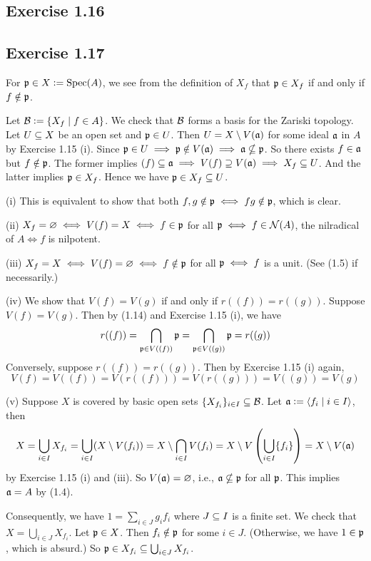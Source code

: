 \documentclass[../A&M.tex]{subfiles}
\begin{document}
\subsection*{Exercise 1.16}

\subsection*{Exercise 1.17}

For $\mathfrak{p}\in X:=\operatorname{Spec}(A)$, we see from the definition of $X_f$ that $\mathfrak{p}\in X_f$ if and only if $f\notin\mathfrak{p}$.

Let $\mathcal{B}:=\{ X_f \mid f\in A\}$. We check that $\mathcal{B}$ forms a basis for the Zariski topology. Let $U\subseteq X$ be an open set and $\mathfrak{p}\in U$. Then $U=X \setminus V(\mathfrak{a})$ for some ideal $\mathfrak{a}$ in $A$ by Exercise 1.15 (i). Since $\mathfrak{p}\in U \implies \mathfrak{p}\notin V(\mathfrak{a}) \implies \mathfrak{a}\nsubseteq\mathfrak{p}$. So there exists $f\in\mathfrak{a}$ but $f\notin\mathfrak{p}$. The former implies $(f)\subseteq\mathfrak{a} \implies V(f)\supseteq V(\mathfrak{a}) \implies X_f \subseteq U$. And the latter implies $\mathfrak{p}\in X_f$. Hence we have $\mathfrak{p} \in X_f \subseteq U$.

(i) This is equivalent to show that both $f,g \notin \mathfrak{p} \iff fg \notin \mathfrak{p}$, which is clear.

(ii) $X_f=\varnothing \iff V(f)=X \iff f\in\mathfrak{p}$ for all $\mathfrak{p} \iff f\in \mathcal{N}(A)$, the nilradical of $A \iff f$ is nilpotent.

(iii) $X_f=X \iff V(f)=\varnothing \iff f\notin\mathfrak{p}$ for all $\mathfrak{p} \iff f$ is a unit. (See (1.5) if necessarily.)

(iv) We show that $V(f)=V(g)$ if and only if $r((f))=r((g))$. Suppose $V(f)=V(g)$. Then by (1.14) and Exercise 1.15 (i), we have
$$
r((f)) = \bigcap_{\mathfrak{p}\in V((f))} \mathfrak{p} = \bigcap_{\mathfrak{p}\in V((g))} \mathfrak{p} = r((g))
$$
Conversely, suppose $r((f))=r((g))$. Then by Exercise 1.15 (i) again,
$$
V(f) = V((f)) = V(r((f))) = V(r((g))) = V((g)) = V(g)
$$

(v) Suppose $X$ is covered by basic open sets $\{X_{f_i}\}_{i\in I} \subseteq \mathcal{B}$. Let $\mathfrak{a}:=\langle f_i \mid i\in I \rangle$, then
$$
X = \bigcup_{i\in I} X_{f_i} = \bigcup_{i\in I} (X\setminus V(f_i)) = X\setminus  \bigcap_{i\in I} V(f_i) = X \setminus V\left( \bigcup_{i\in I} \{f_i\} \right) = X\setminus V(\mathfrak{a})
$$
by Exercise 1.15 (i) and (iii). So $V(\mathfrak{a})=\varnothing$, i.e., $\mathfrak{a}\nsubseteq\mathfrak{p}$ for all $\mathfrak{p}$. This implies $\mathfrak{a}=A$ by (1.4).

Consequently, we have $1=\sum_{i\in J} g_if_i$ where $J\subseteq I$ is a finite set. We check that $X=\bigcup_{i\in J} X_{f_i}$. Let $\mathfrak{p}\in X$. Then $f_i\notin \mathfrak{p}$ for some $i\in J$. (Otherwise, we have $1\in \mathfrak{p}$, which is absurd.) So $\mathfrak{p}\in X_{f_i} \subseteq \bigcup_{i\in J} X_{f_i}$.
\end{document}
